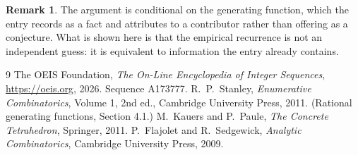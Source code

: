 \documentclass[11pt,a4paper]{article}
\theoremstyle{plain}
\theoremstyle{definition}
\newtheorem{remark}[theorem]{Remark}
\begin{document}
\begin{remark}
The argument is conditional on the generating function, which the entry records as a fact and
attributes to a contributor rather than offering as a conjecture. What is shown here is that
the empirical recurrence is not an independent guess: it is equivalent to information the
entry already contains.
\end{remark}

\begin{thebibliography}{9}
 The OEIS Foundation, \emph{The On-Line Encyclopedia of Integer
Sequences}, \url{https://oeis.org}, 2026. Sequence A173777.
 R.~P.~Stanley, \emph{Enumerative Combinatorics}, Volume 1, 2nd ed.,
Cambridge University Press, 2011. (Rational generating functions, Section 4.1.)
 M.~Kauers and P.~Paule, \emph{The Concrete Tetrahedron}, Springer, 2011.
 P.~Flajolet and R.~Sedgewick, \emph{Analytic Combinatorics}, Cambridge
University Press, 2009.
\end{thebibliography}
\end{document}
